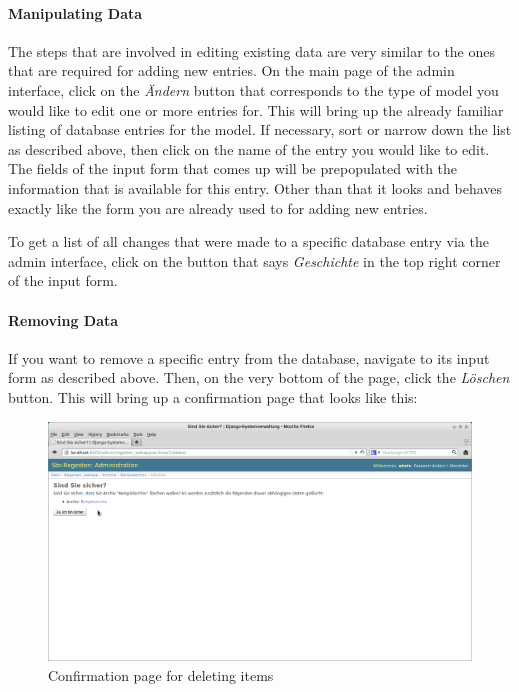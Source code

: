\paragraph{Manipulating Data}
The steps that are involved in editing existing data are very similar
to the ones that are required for adding new entries. On the main page
of the admin interface, click on the \emph{Ändern} button that
corresponds to the type of model you would like to edit one or more
entries for. This will bring up the already familiar listing of
database entries for the model. If necessary, sort or narrow down the
list as described above, then click on the name of the entry you would
like to edit. The fields of the input form that comes up will be
prepopulated with the information that is available for this entry.
Other than that it looks and behaves exactly like the form you are
already used to for adding new entries.

To get a list of all changes that were made to a specific database
entry via the admin interface, click on the button that says
\emph{Geschichte} in the top right corner of the input form.

\paragraph{Removing Data}
If you want to remove a specific entry from the database, navigate to
its input form as described above. Then, on the very bottom of the
page, click the \emph{Löschen} button. This will bring up a
confirmation page that looks like this:

\begin{figure}[h]
  \centering
  \includegraphics[scale=0.3]{img/confirm-delete}
  \caption{Confirmation page for deleting items}
  \label{fig:confirm-delete}
\end{figure}

